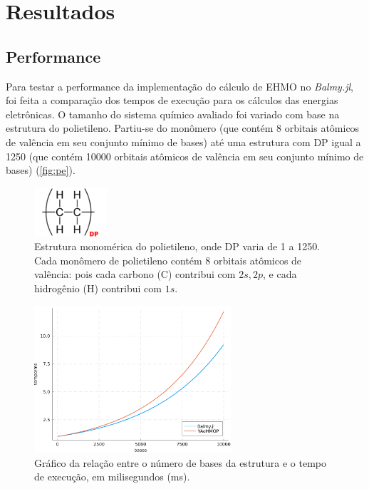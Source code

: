 \chapter{Resultados}

\section{Performance}

Para testar a performance da implementação do cálculo de \gls{EHMO} no \textit{Balmy.jl}, foi feita a comparação dos tempos de execução para os cálculos das energias eletrônicas. O tamanho do sistema químico avaliado foi variado com base na estrutura do polietileno. Partiu-se do monômero (que contém 8 orbitais atômicos de valência em seu conjunto mínimo de bases) até uma estrutura com \gls{DP} igual a 1250 (que contém 10000 orbitais atômicos de valência em seu conjunto mínimo de bases) (\autoref{fig:pe}).

\begin{figure}[htb]
\caption{\label{fig:pe} Estrutura monomérica do polietileno, onde \gls{DP} varia de 1 a 1250. Cada monômero de polietileno contém 8 orbitais atômicos de valência: pois cada carbono (C) contribui com $2s, 2p$, e cada hidrogênio (H) contribui com $1s$.}
	\begin{center}
		\includegraphics[width=0.24\textwidth]{images/aromaticity(2).png}
	\end{center}
\end{figure}

\begin{figure}[htb]
\caption{\label{fig:times} Gráfico da relação entre o número de bases da estrutura e o tempo de execução, em milisegundos (ms).}
	\begin{center}
		\includegraphics[width=0.65\textwidth]{images/tttt.png}
	\end{center}
\end{figure}

